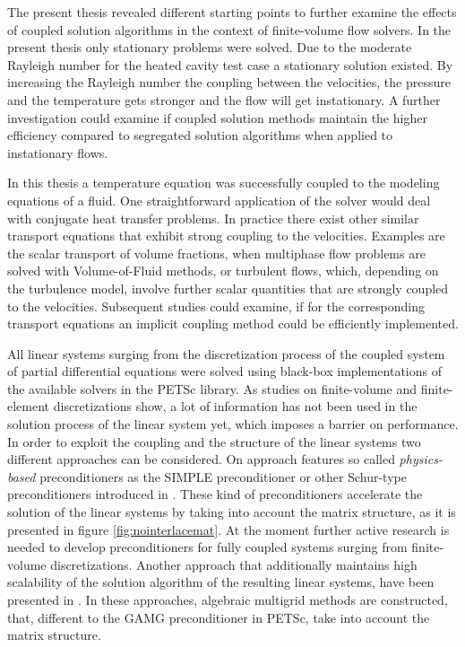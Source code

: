 The present thesis revealed different starting points to further examine the effects of coupled solution algorithms in the context of finite-volume flow solvers. In the present thesis only stationary problems were solved. Due to the moderate Rayleigh number for the heated cavity test case a stationary solution existed. By increasing the Rayleigh number the coupling between the velocities, the pressure and the temperature gets stronger and the flow will get instationary. A further investigation could examine if coupled solution methods maintain the higher efficiency compared to segregated solution algorithms when applied to instationary flows.

In this thesis a temperature equation was successfully coupled to the modeling equations of a fluid. One straightforward application of the solver would deal with conjugate heat transfer problems. In practice there exist other similar transport equations that exhibit strong coupling to the velocities. Examples are the scalar transport of volume fractions, when multiphase flow problems are solved with Volume-of-Fluid methods, or turbulent flows, which, depending on the turbulence model, involve further scalar quantities that are strongly coupled to the velocities. Subsequent studies could examine, if for the corresponding transport equations an implicit coupling method could be efficiently implemented.

All linear systems surging from the discretization process of the coupled system of partial differential equations were solved using black-box implementations of the available solvers in the PETSc library. As studies on finite-volume \cite{klaij13,darwish09,mangani14} and finite-element \cite{brown12,elman03,elman08,silvester01,turek02,mcinnes14} discretizations show, a lot of information has not been used in the solution process of the linear system yet, which imposes a barrier on performance. In order to exploit the coupling and the structure of the linear systems two different approaches can be considered. On approach features so called \emph{physics-based} preconditioners as the SIMPLE preconditioner or other Schur-type preconditioners introduced in \cite{klaij13,elman08}. These kind of preconditioners accelerate the solution of the linear systems by taking into account the matrix structure, as it is presented in figure \ref{fig:nointerlacemat}. At the moment further active research is needed to develop preconditioners for fully coupled systems surging from finite-volume discretizations. Another approach that additionally maintains high scalability of the solution algorithm of the resulting linear systems, have been presented in \cite{darwish09,mangani14}. In these approaches, algebraic multigrid methods are constructed, that, different to the GAMG preconditioner in PETSc, take into account the matrix structure.

